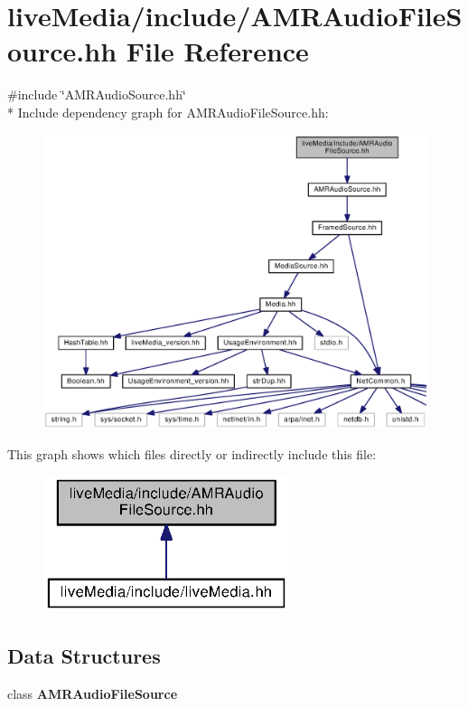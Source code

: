 \section{live\+Media/include/\+A\+M\+R\+Audio\+File\+Source.hh File Reference}
\label{AMRAudioFileSource_8hh}
{\ttfamily \#include \char`\"{}A\+M\+R\+Audio\+Source.\+hh\char`\"{}}\\*
Include dependency graph for A\+M\+R\+Audio\+File\+Source.\+hh\+:
\nopagebreak
\begin{figure}[H]
\begin{center}
\leavevmode
\includegraphics[width=350pt]{AMRAudioFileSource_8hh__incl}
\end{center}
\end{figure}
This graph shows which files directly or indirectly include this file\+:
\nopagebreak
\begin{figure}[H]
\begin{center}
\leavevmode
\includegraphics[width=204pt]{AMRAudioFileSource_8hh__dep__incl}
\end{center}
\end{figure}
\subsection*{Data Structures}
\begin{DoxyCompactItemize}
\item 
class {\bf A\+M\+R\+Audio\+File\+Source}
\end{DoxyCompactItemize}
